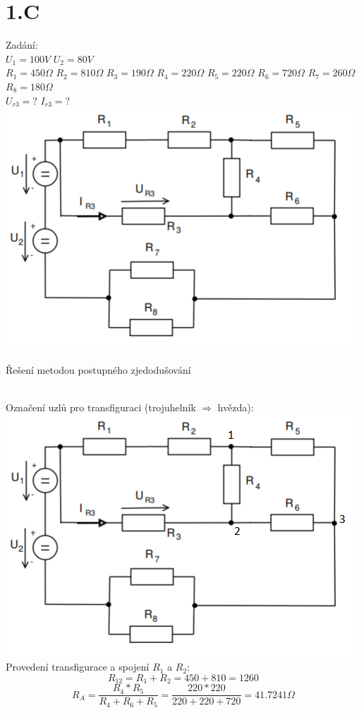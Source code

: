 \documentclass[11pt]{article}
\begin{document}
\section*{1.C}
\large{Zadání:}\\
$U_1 = 100V$
$U_2 = 80V$\\
$R_1 = 450\Omega$
$R_2 = 810\Omega$
$R_3 = 190\Omega$
$R_4 = 220\Omega$
$R_5 = 220\Omega$
$R_6 = 720\Omega$
$R_7 = 260\Omega$
$R_8 = 180\Omega$\\
$U_{r3} = ?$
$I_{r3} = ?$\\
\includegraphics[width=0.8\linewidth]{priklad1_zadani.png}\\
\centerline {\huge{Řešení metodou postupného zjedodušování}}\\
Označení uzlů pro transfiguraci (trojuhelník $\Rightarrow$ hvězda):\\
\includegraphics[width=0.8\linewidth]{priklad1_oznaceniBodu.png}\\
Provedení transfigurace a spojení $R_1$ a $R_2$:\\
$$R_{12} = R_1 + R_2 = 450 + 810 = 1260$$
$$R_A = \frac{R_4 * R_5}{R_4 + R_6 + R_5} = \frac{220*220}{220+220+720} = 41.7241\Omega$$
\end{document}
